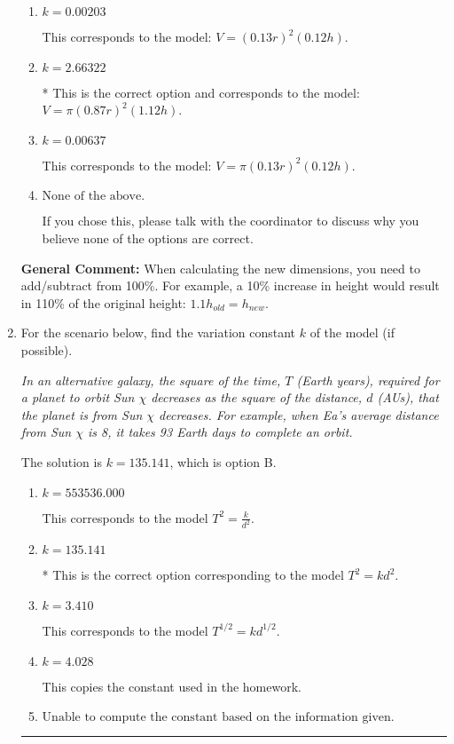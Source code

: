 \documentclass{extbook}[14pt]
\newcommand{\litem}[1]{\item #1

\rule{\textwidth}{0.4pt}}
\begin{document}
\begin{enumerate}
{\begin{enumerate}[label=\Alph*.]
This corresponds to the model: $V = (0.87 r)^2 (1.12 h)$.
\item \( k = 0.00203 \)

This corresponds to the model: $V = (0.13 r)^2 (0.12 h)$.
\item \( k = 2.66322 \)

* This is the correct option and corresponds to the model: $V = \pi (0.87 r)^2 (1.12 h)$.
\item \( k = 0.00637 \)

This corresponds to the model: $V = \pi (0.13 r)^2 (0.12 h)$.
\item \( \text{None of the above.} \)

If you chose this, please talk with the coordinator to discuss why you believe none of the options are correct.
\end{enumerate}

\textbf{General Comment:} When calculating the new dimensions, you need to add/subtract from 100\%. For example, a 10\% increase in height would result in 110\% of the original height: $1.1h_{old} = h_{new}$.
}
\litem{
For the scenario below, find the variation constant $k$ of the model (if possible).

\begin{center}
    \textit{ In an alternative galaxy, the square of the time, $T$ (Earth years), required for a planet to orbit Sun $\chi$ decreases as the square of the distance, $d$ (AUs), that the planet is from Sun $\chi$ decreases. For example, when Ea's average distance from Sun $\chi$ is 8, it takes 93 Earth days to complete an orbit. }
\end{center}
The solution is \( k = 135.141 \), which is option B.\begin{enumerate}[label=\Alph*.]
\item \( k = 553536.000 \)

This corresponds to the model $T^{2} = \frac{k}{d^{2}}$.
\item \( k = 135.141 \)

* This is the correct option corresponding to the model $T^{2} = k d^{2}$.
\item \( k = 3.410 \)

This corresponds to the model $T^{1/2} = k d^{1/2}$.
\item \( k = 4.028 \)

This copies the constant used in the homework.
\item \( \text{Unable to compute the constant based on the information given.} \)


\end{enumerate}}
\end{enumerate}
\end{document}

